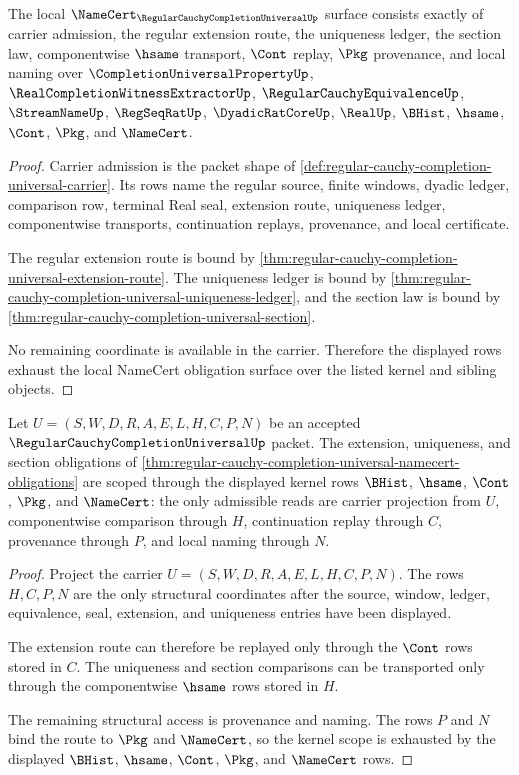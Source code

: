 \begin{theorem}
\label{thm:regular-cauchy-completion-universal-namecert-obligations}
The local $\NameCert_{\RegularCauchyCompletionUniversalUp}$ surface consists exactly of carrier admission, the regular extension route, the uniqueness ledger, the section law, componentwise $\hsame$ transport, $\Cont$ replay, $\Pkg$ provenance, and local naming over $\CompletionUniversalPropertyUp$, $\RealCompletionWitnessExtractorUp$, $\RegularCauchyEquivalenceUp$, $\StreamNameUp$, $\RegSeqRatUp$, $\DyadicRatCoreUp$, $\RealUp$, $\BHist$, $\hsame$, $\Cont$, $\Pkg$, and $\NameCert$.
\end{theorem}
\begin{proof}
Carrier admission is the packet shape of \autoref{def:regular-cauchy-completion-universal-carrier}. Its rows name the regular source, finite windows, dyadic ledger, comparison row, terminal Real seal, extension route, uniqueness ledger, componentwise transports, continuation replays, provenance, and local certificate.

The regular extension route is bound by \autoref{thm:regular-cauchy-completion-universal-extension-route}. The uniqueness ledger is bound by \autoref{thm:regular-cauchy-completion-universal-uniqueness-ledger}, and the section law is bound by \autoref{thm:regular-cauchy-completion-universal-section}.

No remaining coordinate is available in the carrier. Therefore the displayed rows exhaust the local NameCert obligation surface over the listed kernel and sibling objects.
\end{proof}

\begin{theorem}
\label{thm:regular-cauchy-completion-universal-kernel-scope}
Let $U=(S,W,D,R,A,E,L,H,C,P,N)$ be an accepted $\RegularCauchyCompletionUniversalUp$ packet. The extension, uniqueness, and section obligations of \autoref{thm:regular-cauchy-completion-universal-namecert-obligations} are scoped through the displayed kernel rows $\BHist$, $\hsame$, $\Cont$, $\Pkg$, and $\NameCert$: the only admissible reads are carrier projection from $U$, componentwise comparison through $H$, continuation replay through $C$, provenance through $P$, and local naming through $N$.
\end{theorem}
\begin{proof}
Project the carrier $U=(S,W,D,R,A,E,L,H,C,P,N)$. The rows $H,C,P,N$ are the only structural coordinates after the source, window, ledger, equivalence, seal, extension, and uniqueness entries have been displayed.

The extension route can therefore be replayed only through the $\Cont$ rows stored in $C$. The uniqueness and section comparisons can be transported only through the componentwise $\hsame$ rows stored in $H$.

The remaining structural access is provenance and naming. The rows $P$ and $N$ bind the route to $\Pkg$ and $\NameCert$, so the kernel scope is exhausted by the displayed $\BHist$, $\hsame$, $\Cont$, $\Pkg$, and $\NameCert$ rows.
\end{proof}

